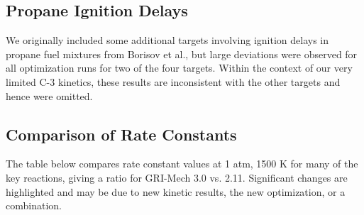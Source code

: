 \subsection*{Propane Ignition Delays}
We originally included some additional targets involving ignition delays in propane fuel mixtures from Borisov et al., but large deviations were observed for all optimization runs for two of the four targets. Within the context of our very limited C-3 kinetics, these results are inconsistent with the other targets and hence were omitted.

\subsection*{Comparison of Rate Constants}
The table below compares rate constant values at 1 atm, 1500 K for many of the key reactions, giving a ratio for GRI-Mech 3.0 vs. 2.11. Significant changes are highlighted and may be due to new kinetic results, the new optimization, or a combination.


